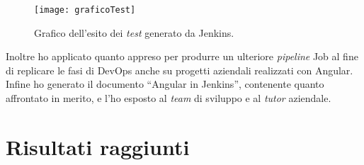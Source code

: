 \begin{figure}[htbp] 
    \centering 
    \texttt{[image: graficoTest]} 
    \caption{Grafico dell'esito dei \emph{test} generato da Jenkins.}
    \label{fig:graficoTest}
\end{figure}
\noindent Inoltre ho applicato quanto appreso per produrre un ulteriore \emph{pipeline} Job al fine di replicare le fasi di \gls{DevOps} anche su progetti aziendali realizzati con Angular.\\
Infine ho generato il documento “Angular in Jenkins”, contenente quanto affrontato in merito, e l'ho esposto al \emph{team} di sviluppo e al \emph{\emph{tutor}} aziendale. 



\section{Risultati raggiunti}%
